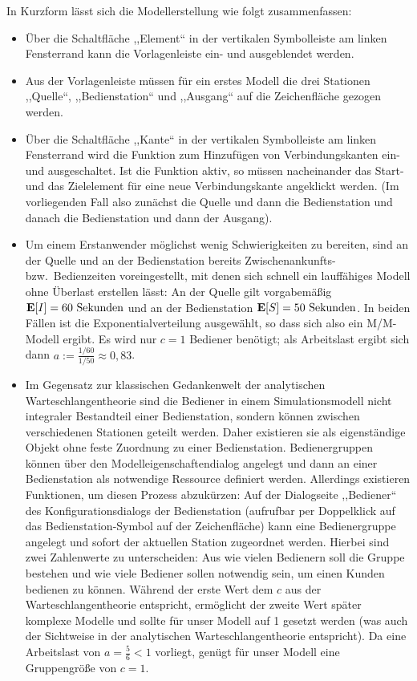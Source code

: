 \documentclass[deutsch]{svmono}
\begin{document}
In Kurzform lässt sich die Modellerstellung wie folgt zusammenfassen:
\begin{itemize}
\item
Über die Schaltfläche ,,Element`` in der vertikalen Symbolleiste am linken Fensterrand kann die Vorlagenleiste ein- und ausgeblendet werden.
\item
Aus der Vorlagenleiste müssen für ein erstes Modell die drei Stationen ,,Quelle``, ,,Bedienstation`` und ,,Ausgang`` auf die Zeichenfläche gezogen werden.
\item
Über die Schaltfläche ,,Kante`` in der vertikalen Symbolleiste am linken Fensterrand wird die Funktion zum Hinzufügen von Verbindungskanten ein- und ausgeschaltet. Ist die Funktion aktiv, so müssen nacheinander das Start- und das Zielelement für eine neue Verbindungskante angeklickt werden. (Im vorliegenden Fall also zunächst die Quelle und dann die Bedienstation und danach die Bedienstation und dann der Ausgang).
\item
Um einem Erstanwender möglichst wenig Schwierigkeiten zu bereiten, sind an der Quelle und an der Bedienstation bereits Zwischenankunfts- bzw.\ Bedienzeiten voreingestellt, mit denen sich schnell ein lauffähiges Modell ohne Überlast erstellen lässt: An der Quelle gilt vorgabemäßig ${\bf E}[I]=60{\rm~Sekunden}$ und an der Bedienstation ${\bf E}[S]=50{\rm~Sekunden}$. In beiden Fällen ist die Exponentialverteilung ausgewählt, so dass sich also ein M/M-Modell ergibt. Es wird nur $c=1$ Bediener benötigt; als Arbeitslast ergibt sich dann $a:=\frac{1/60}{1/50}\approx0{,}83$.
\item
Im Gegensatz zur klassischen Gedankenwelt der analytischen Warteschlangentheorie sind die Bediener in einem Simulationsmodell nicht integraler Bestandteil einer Bedienstation, sondern können zwischen verschiedenen Stationen geteilt werden. Daher existieren sie als eigenständige Objekt ohne feste Zuordnung zu einer Bedienstation. Bedienergruppen können über den Modelleigenschaftendialog angelegt und dann an einer Bedienstation als notwendige Ressource definiert werden. Allerdings existieren Funktionen, um diesen Prozess abzukürzen: Auf der Dialogseite ,,Bediener`` des Konfigurationsdialogs der Bedienstation (aufrufbar per Doppelklick auf das Bedienstation-Symbol auf der Zeichenfläche) kann eine Bedienergruppe angelegt und sofort der aktuellen Station zugeordnet werden. Hierbei sind zwei Zahlenwerte zu unterscheiden: Aus wie vielen Bedienern soll die Gruppe bestehen und wie viele Bediener sollen notwendig sein, um einen Kunden bedienen zu können. Während der erste Wert dem $c$ aus der Warteschlangentheorie entspricht, ermöglicht der zweite Wert später komplexe Modelle und sollte für unser Modell auf 1 gesetzt werden (was auch der Sichtweise in der analytischen Warteschlangentheorie entspricht). Da eine Arbeitslast von $a=\frac{5}{6}<1$ vorliegt, genügt für unser Modell eine Gruppengröße von $c=1$.
\end{itemize}
\end{document}
